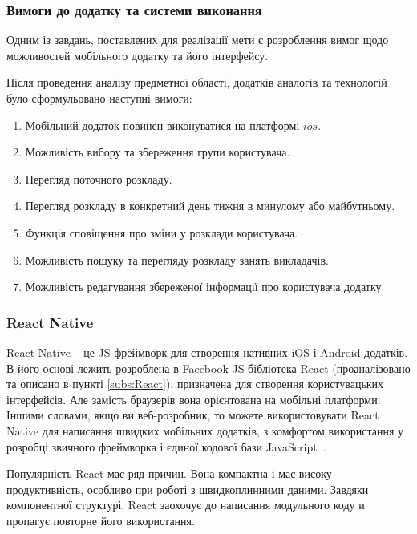 \subsubsection{Вимоги до додатку та системи виконання}

Одним із завдань, поставлених для реалізації мети є розроблення вимог щодо можливостей мобільного додатку та його інтерфейсу.

Після проведення аналізу предметної області, додатків аналогів та технологій було сформульовано наступні вимоги:

\begin{enumerate}
    \item Мобільний додаток повинен виконуватися на платформі $ios$.
    \item Можливість вибору та збереження групи користувача.
    \item Перегляд поточного розкладу.
    \item Перегляд розкладу в конкретний день тижня в минулому або майбутньому. 
    \item Функція сповіщення про зміни у розклади користувача.
    \item Можливість пошуку та перегляду розкладу занять викладачів.
    \item Можливість редагування збереженої інформації про користувача додатку.
\end{enumerate}

\subsubsection{React Native}


React Native -- це JS-фреймворк для створення нативних iOS і Android додатків. В його основі лежить розроблена в Facebook JS-бібліотека React (проаналізовано та описано в пункті \ref{subs:React}), призначена для створення користувацьких інтерфейсів. Але замість браузерів вона орієнтована на мобільні платформи. Іншими словами, якщо ви веб-розробник, то можете використовувати React Native для написання  швидких мобільних додатків, з комфортом використання у розробці звичного фреймворка і єдиної кодової бази JavaScript~\cite{jeffgothelf2016}.

Популярність React має ряд причин. Вона компактна і має високу продуктивність, особливо при роботі з швидкоплинними даними. Завдяки компонентної структурі, React заохочує до написання модульного коду и пропагує повторне його використання.

